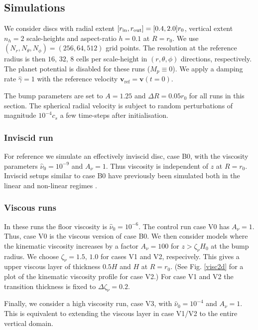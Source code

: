 \subsection{Simulations}
We consider discs with radial extent $[r_\mathrm{in},r_\mathrm{out}]=[0.4,2.0]r_0$,
vertical extent $n_h=2$ scale-heights and aspect-ratio $h=0.1$ at
$R=r_0$. We use $(N_r, N_\theta,
N_\phi)=(256,64,512)$ grid points. 
The resolution at the reference radius is then
$16,\,32,\,8$ cells per scale-height in $(r,\theta,\phi)$ directions,
respectively. The planet potential is disabled for these runs
($M_p\equiv 0$). We apply a damping rate $\hat{\gamma}=1$ with the
reference velocity $\bm{v}_\mathrm{ref}=\bm{v}(t=0)$.     

The bump parameters are set to $A=1.25$ and $\Delta R = 0.05r_0$ for
all runs in this section. The spherical radial velocity is subject 
to random perturbations of magnitude $10^{-4}c_s$ 
a few time-steps after initialisation. 

\subsubsection{Inviscid run}
For reference we simulate an effectively inviscid disc, case B0,
with the viscosity parameters $\hat{\nu}_0=10^{-9}$ and $A_\nu = 1$.  
Thus viscosity is independent of $z$ at $R=r_0$.   
Inviscid setups similar to case B0 have previously been simulated
both in the linear and non-linear regimes  \citep{meheut12, lin13}. 

\subsubsection{Viscous runs}
In these runs the floor viscosity is 
$\hat{\nu}_0=10^{-6}$. The control run case V0 has $A_\nu =
1$. Thus, case V0 is the viscous version of case B0.  
We then consider models where the kinematic viscosity increases by
a factor $A_\nu=100$ for $z>\zeta_\nu H_0$ at the bump radius. We
choose $\zeta_\nu=1.5,\,1.0$ for cases V1 and V2, respecively.  This
gives a upper 
viscous layer of thickness $0.5H$ and $H$ at $R=r_0$. (See
Fig. \ref{visc2d} for a plot of the kinematic viscosity profile for case V2.) 
For case V1 and V2 the transition thickness is fixed to
$\Delta\zeta_\nu=0.2$.  
 
Finally, we consider a high viscosity run, case V3, 
with $\hat{\nu}_0=10^{-4}$ and $A_\nu=1$.  This is equivalent to
extending the viscous layer in case V1/V2 to the entire vertical
domain.  

